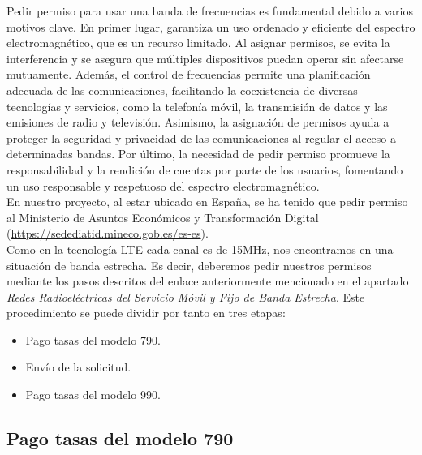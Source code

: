 Pedir permiso para usar una banda de frecuencias es fundamental debido a varios motivos clave. En primer lugar, garantiza un uso ordenado y eficiente del espectro electromagnético, que es un recurso limitado. Al asignar permisos, se evita la interferencia y se asegura que múltiples dispositivos puedan operar sin afectarse mutuamente. Además, el control de frecuencias permite una planificación adecuada de las comunicaciones, facilitando la coexistencia de diversas tecnologías y servicios, como la telefonía móvil, la transmisión de datos y las emisiones de radio y televisión. Asimismo, la asignación de permisos ayuda a proteger la seguridad y privacidad de las comunicaciones al regular el acceso a determinadas bandas. Por último, la necesidad de pedir permiso promueve la responsabilidad y la rendición de cuentas por parte de los usuarios, fomentando un uso responsable y respetuoso del espectro electromagnético.\\

En nuestro proyecto, al estar ubicado en España, se ha tenido que pedir permiso al Ministerio de Asuntos Económicos y Transformación Digital (\url{https://sedediatid.mineco.gob.es/es-es}).\\

Como en la tecnología LTE cada canal es de 15MHz, nos encontramos en una situación de banda estrecha. Es decir, deberemos pedir nuestros permisos mediante los pasos descritos del enlace anteriormente mencionado en el apartado \textit{Redes Radioeléctricas del Servicio Móvil y Fijo de Banda Estrecha}. Este procedimiento se puede dividir por tanto en tres etapas:

\begin{itemize}
\item Pago tasas del modelo 790.
\item Envío de la solicitud.
\item Pago tasas del modelo 990.
\end{itemize}

\subsection{Pago tasas del modelo 790}

